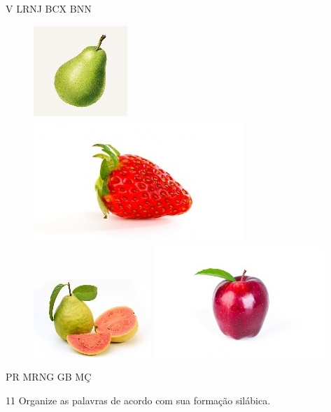 V \hspace{1.5cm} LRNJ \hspace{1cm} BCX \hspace{1cm} BNN

\begin{figure}[htpb!]
\includegraphics[width=.24\textwidth]{media/image73.jpeg}
\includegraphics[width=.24\textwidth]{media/image74.jpeg}
\includegraphics[width=.24\textwidth]{media/image75.jpeg}
\includegraphics[width=.24\textwidth]{media/image76.jpeg}
\end{figure}

PR \hspace{1cm} MRNG \hspace{1cm} GB \hspace{1cm} MÇ

\num{11} Organize as palavras de acordo com sua formação silábica.


